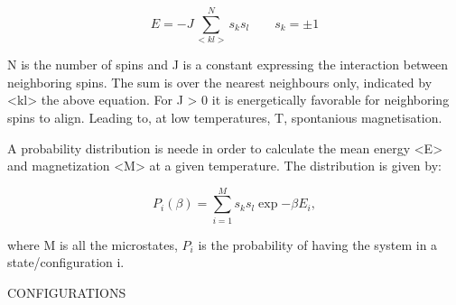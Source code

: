 \documentclass[../main.tex]{subfiles}
\begin{document}
    \begin{equation}
      E = -J \sum  _{<kl>}^N s_ks_l \qquad s_k = \pm 1
    \end{equation}

    N is the number of spins and J is a constant expressing the interaction between neighboring spins. The sum is over the nearest neighbours only, indicated by <kl> the above equation. For J > 0 it is energetically favorable for neighboring spins to align. Leading to, at low temperatures, T, spontanious magnetisation.

    A probability distribution is neede in order to calculate the mean energy <E> and magnetization <M> at a given temperature. The distribution is given by:

    \begin{equation}
      P_i(\beta)=  \sum  _{i = 1}^M s_ks_l \exp{-\beta E_i},
    \end{equation}

    where M is all the microstates, $P_i$ is the probability of having the system in a state/configuration i.

    CONFIGURATIONS
\end{document}
